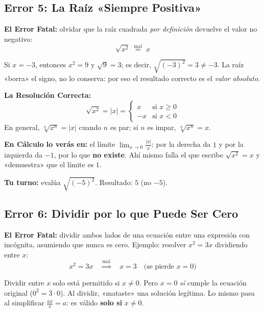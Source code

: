 \documentclass[12pt, letterpaper]{article}
\begin{document}
\subsection{Error 5: La Raíz «Siempre Positiva»}

\begin{cuadroadvertencia}
  \textbf{El Error Fatal:} olvidar que la raíz cuadrada \emph{por definición} devuelve el valor no negativo:
  \[
    \sqrt{x^2} \;\overset{\text{mal}}{=}\; x
  \]
\end{cuadroadvertencia}

Si $x = -3$, entonces $x^2 = 9$ y $\sqrt{9} = 3$; es decir, $\sqrt{(-3)^2} = 3 \neq -3$. La raíz «borra» el signo, no lo conserva: por eso el resultado correcto es el \emph{valor absoluto}.

\begin{cuadrosolucion}
  \textbf{La Resolución Correcta:}
  \[
    \sqrt{x^2} = |x| = \begin{cases} x & \text{si } x \geq 0 \\ -x & \text{si } x < 0 \end{cases}
  \]
  En general, $\sqrt[n]{x^n} = |x|$ cuando $n$ es par; si $n$ es impar, $\sqrt[n]{x^n} = x$.
\end{cuadrosolucion}

\noindent\textbf{En Cálculo lo verás en:} el límite $\lim_{x \to 0} \frac{|x|}{x}$: por la derecha da $1$ y por la izquierda da $-1$, por lo que \textbf{no existe}. Ahí mismo falla el que escribe $\sqrt{x^2} = x$ y «demuestra» que el límite es $1$.

\noindent\textbf{Tu turno:} evalúa $\sqrt{(-5)^2}$. Resultado: $5$ (no $-5$).

\subsection{Error 6: Dividir por lo que Puede Ser Cero}

\begin{cuadroadvertencia}
  \textbf{El Error Fatal:} dividir ambos lados de una ecuación entre una expresión con incógnita, asumiendo que nunca es cero. Ejemplo: resolver $x^2 = 3x$ dividiendo entre $x$:
  \[
    x^2 = 3x \quad \overset{\text{mal}}{\Rightarrow} \quad x = 3 \quad \text{(se pierde } x = 0\text{)}
  \]
\end{cuadroadvertencia}

Dividir entre $x$ solo está permitido si $x \neq 0$. Pero $x = 0$ \emph{sí} cumple la ecuación original ($0^2 = 3 \cdot 0$). Al dividir, «mataste» una solución legítima. Lo mismo pasa al simplificar $\frac{ax}{x} = a$: es válido \textbf{solo si} $x \neq 0$.
\end{document}
